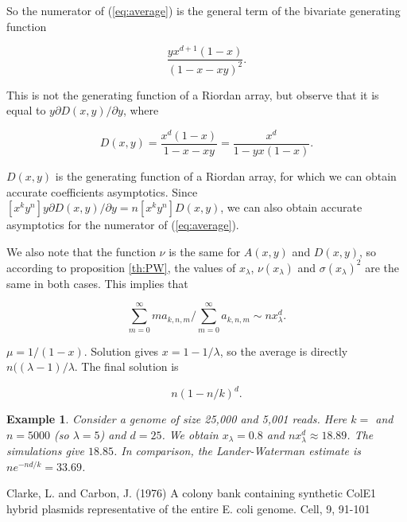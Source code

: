 \documentclass{article}
\newtheorem{example}{Example}
\begin{document}
So the numerator of (\ref{eq:average}) is the general term of the
bivariate generating function

\begin{equation*}
\frac{yx^{d+1}(1-x)}{\left(1-x-xy\right)^2}.
\end{equation*}

This is not the generating function of a Riordan array, but observe that
it is equal to $y\partial D(x,y)/\partial y$, where

\begin{equation*}
D(x,y) = \frac{x^d(1-x)}{1-x-xy} =
\frac{x^d}{1-yx(1-x)}.
\end{equation*}

$D(x,y)$ is the generating function of a Riordan array, for which we can
obtain accurate coefficients asymptotics. Since $[x^ky^n]y\partial D(x,y)
/ \partial y = n[x^ky^n]D(x,y)$, we can also obtain accurate
asymptotics for the numerator of (\ref{eq:average}).

We also note that the function $\nu$ is the same for $A(x,y)$ and
$D(x,y)$, so according to proposition \ref{th:PW}, the values of
$x_\lambda$, $\nu(x_\lambda)$ and $\sigma(x_\lambda)^2$ are the same in
both cases. This implies that

\begin{equation*}
\sum_{m=0}^\infty ma_{k,n,m}\Big/\sum_{m=0}^\infty a_{k,n,m} \sim
n x_\lambda^d.
\end{equation*}

$\mu = 1/(1-x)$. Solution gives $x = 1-1/\lambda$, so the average is
directly $n((\lambda-1)/\lambda$. The final solution is

\begin{equation*}
n\left(1-n/k\right)^d.
\end{equation*}

\begin{example}
Consider a genome of size 25,000 and 5,001 reads. Here $k = $ and $n =
5000$ (so $\lambda = 5$) and $d = 25$. We obtain $x_\lambda = 0.8$
and $n x_\lambda^d \approx 18.89$. The simulations give
$18.85$. In comparison, the Lander-Waterman estimate is $ne^{-nd/k} =
33.69$.
\end{example}

Clarke, L. and Carbon, J. (1976) A colony bank containing synthetic ColE1
hybrid plasmids representative of the entire E. coli genome. Cell, 9,
91-101





\end{document}
